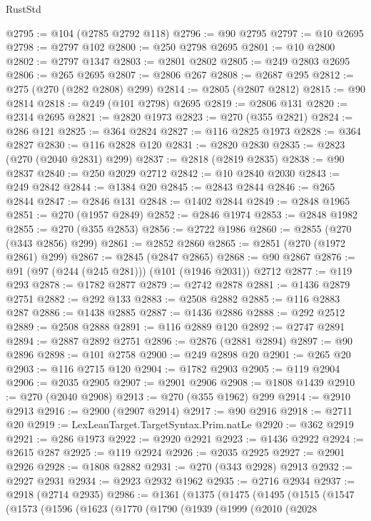 \begin{lexlean}{RustStd}
\begin{coremodule}
@2795 := @104 (@2785 @2792 @118)
@2796 := @90 @2795
@2797 := @10 @2695
@2798 := @2797 @102
@2800 := @250 @2798 @2695
@2801 := @10 @2800
@2802 := @2797 @1347
@2803 := @2801 @2802
@2805 := @249 @2803 @2695
@2806 := @265 @2695
@2807 := @2806 @267
@2808 := @2687 @295
@2812 := @275 (@270 (@282 @2808) @299)
@2814 := @2805 (@2807 @2812)
@2815 := @90 @2814
@2818 := @249 (@101 @2798) @2695
@2819 := @2806 @131
@2820 := @2314 @2695
@2821 := @2820 @1973
@2823 := @270 (@355 @2821)
@2824 := @286 @121
@2825 := @364 @2824
@2827 := @116 @2825 @1973
@2828 := @364 @2827
@2830 := @116 @2828 @120
@2831 := @2820 @2830
@2835 := @2823 (@270 (@2040 @2831) @299)
@2837 := @2818 (@2819 @2835)
@2838 := @90 @2837
@2840 := @250 @2029 @2712
@2842 := @10 @2840 @2030
@2843 := @249 @2842
@2844 := @1384 @20
@2845 := @2843 @2844
@2846 := @265 @2844
@2847 := @2846 @131
@2848 := @1402 @2844
@2849 := @2848 @1965
@2851 := @270 (@1957 @2849)
@2852 := @2846 @1974
@2853 := @2848 @1982
@2855 := @270 (@355 @2853)
@2856 := @2722 @1986
@2860 := @2855 (@270 (@343 @2856) @299)
@2861 := @2852 @2860
@2865 := @2851 (@270 (@1972 @2861) @299)
@2867 := @2845 (@2847 @2865)
@2868 := @90 @2867
@2876 := @91 (@97 (@244 (@245 @281))) (@101 (@1946 @2031)) @2712
@2877 := @119 @293
@2878 := @1782 @2877
@2879 := @2742 @2878
@2881 := @1436 @2879 @2751
@2882 := @292 @133
@2883 := @2508 @2882
@2885 := @116 @2883 @287
@2886 := @1438 @2885
@2887 := @1436 @2886
@2888 := @292 @2512
@2889 := @2508 @2888
@2891 := @116 @2889 @120
@2892 := @2747 @2891
@2894 := @2887 @2892 @2751
@2896 := @2876 (@2881 @2894)
@2897 := @90 @2896
@2898 := @101 @2758
@2900 := @249 @2898 @20
@2901 := @265 @20
@2903 := @116 @2715 @120
@2904 := @1782 @2903
@2905 := @119 @2904
@2906 := @2035 @2905
@2907 := @2901 @2906
@2908 := @1808 @1439
@2910 := @270 (@2040 @2908)
@2913 := @270 (@355 @1962) @299
@2914 := @2910 @2913
@2916 := @2900 (@2907 @2914)
@2917 := @90 @2916
@2918 := @2711 @20
@2919 := LexLeanTarget.TargetSyntax.Prim.natLe
@2920 := @362 @2919
@2921 := @286 @1973
@2922 := @2920 @2921
@2923 := @1436 @2922
@2924 := @2615 @287
@2925 := @119 @2924
@2926 := @2035 @2925
@2927 := @2901 @2926
@2928 := @1808 @2882
@2931 := @270 (@343 @2928) @2913
@2932 := @2927 @2931
@2934 := @2923 @2932 @1962
@2935 := @2716 @2934
@2937 := @2918 (@2714 @2935)
@2986 := @1361
    (@1375
      (@1475
        (@1495
          (@1515
            (@1547
              (@1573
                (@1596
                  (@1623
                    (@1770
                      (@1790
                        (@1939
                          (@1999
                            (@2010
                              (@2028

\end{coremodule}
\end{lexlean}
